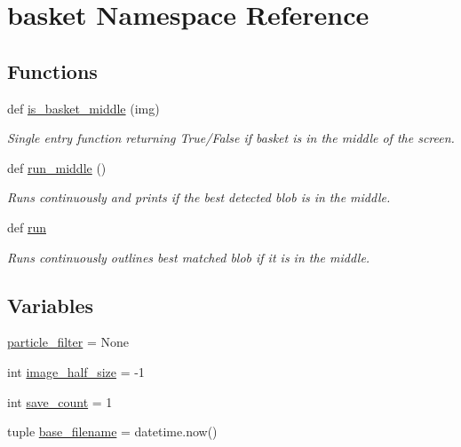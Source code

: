 \section{basket Namespace Reference}
\label{namespacebasket}
\subsection*{Functions}
\begin{DoxyCompactItemize}
\item 
def \hyperlink{namespacebasket_a6244ca5fd7cf7706c81e45e270087d17}{is\+\_\+basket\+\_\+middle} (img)
\begin{DoxyCompactList}\small\item\em Single entry function returning True/\+False if basket is in the middle of the screen. \end{DoxyCompactList}\item 
def \hyperlink{namespacebasket_a0cb50ef447247bf29a40cbdfcd275bc0}{run\+\_\+middle} ()
\begin{DoxyCompactList}\small\item\em Runs continuously and prints if the best detected blob is in the middle. \end{DoxyCompactList}\item 
def \hyperlink{namespacebasket_a00c6a996da6d264c30c7b6c710cacddc}{run}
\begin{DoxyCompactList}\small\item\em Runs continuously outlines best matched blob if it is in the middle. \end{DoxyCompactList}\end{DoxyCompactItemize}
\subsection*{Variables}
\begin{DoxyCompactItemize}
\item 
\hyperlink{namespacebasket_ae8e523df739d65470eb5eba16867f329}{particle\+\_\+filter} = None
\item 
int \hyperlink{namespacebasket_a3c352b285b29250f904de2d4ad7fddaa}{image\+\_\+half\+\_\+size} = -\/1
\item 
int \hyperlink{namespacebasket_a3d020674941ec4faf6734391ca082c40}{save\+\_\+count} = 1
\item 
tuple \hyperlink{namespacebasket_aa3007fa12430ca814f5bf5890bb2fb0f}{base\+\_\+filename} = datetime.\+now()
\end{DoxyCompactItemize}


